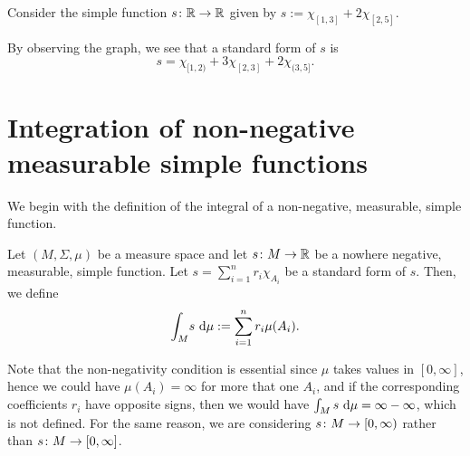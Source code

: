 \begin{example}
Consider the simple function $s\colon \mathbb{R} \to \mathbb{R}$ given by
$s:=\chi_{[1,3]}+2\chi_{[2,5]}$.
\begin{center}
\end{center}
By observing the graph, we see that a standard form of $s$ is
\begin{equation*}
s = \chi_{[1,2)} + 3 \chi_{[2,3]} + 2 \chi_{(3,5]}.
\end{equation*}
\end{example}

\section{\texorpdfstring{
  Integration of non-negative \\ measurable simple functions}
  {Integration of non-negative measurable simple functions}}

We begin with the definition of the integral of a non-negative,
measurable, simple function.

\begin{definition}
  Let $(M,\Sigma,\mu)$ be a measure space and let $s\colon M \to \mathbb{R}$ be a
  nowhere negative, measurable, simple function.
  Let $s=\sum_{i=1}^n r_i \chi_{A_i}$ be a standard form of \(s\).
  Then, we define
  \begin{equation}
    \label{eq:intsimp}
    \int_M \! s \, \mathop{}\!\mathrm{d} \mu := \sum_{i=1}^nr_i\mu(A_i).
  \end{equation}
\end{definition}

Note that the non-negativity condition is essential since $\mu$ takes
values in $[0,\infty]$, hence we could have $\mu(A_i)=\infty$ for more
that one $A_i$, and if the corresponding coefficients $r_i$ have
opposite signs, then we would have $\int_Ms\,\mathop{}\!\mathrm{d}\mu=\infty-\infty$,
which is not defined. For the same reason, we are considering $s\colon
M\to [0,\infty)$ rather than $s\colon M\to [0,\infty]$.

